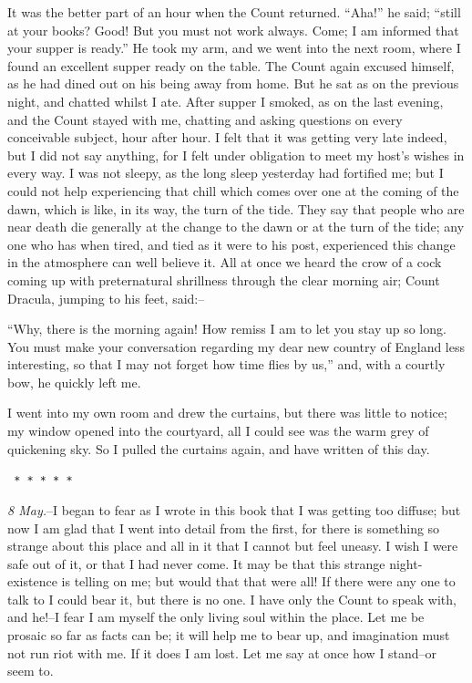 \documentclass[12pt,openright]{book}
\begin{document}
It was the better part of an hour when the Count returned. “Aha!” he said; “still at your books? Good! But you must not work always. Come; I am informed that your supper is ready.” He took my arm, and we went into the next room, where I found an excellent supper ready on the table. The Count again excused himself, as he had dined out on his being away from home. But he sat as on the previous night, and chatted whilst I ate. After supper I smoked, as on the last evening, and the Count stayed with me, chatting and asking questions on every conceivable subject, hour after hour. I felt that it was getting very late indeed, but I did not say anything, for I felt under obligation to meet my host’s wishes in every way. I was not sleepy, as the long sleep yesterday had fortified me; but I could not help experiencing that chill which comes over one at the coming of the dawn, which is like, in its way, the turn of the tide. They say that people who are near death die generally at the change to the dawn or at the turn of the tide; any one who has when tired, and tied as it were to his post, experienced this change in the atmosphere can well believe it. All at once we heard the crow of a cock coming up with preternatural shrillness through the clear morning air; Count Dracula, jumping to his feet, said:–

“Why, there is the morning again! How remiss I am to let you stay up so long. You must make your conversation regarding my dear new country of England less interesting, so that I may not forget how time flies by us,” and, with a courtly bow, he quickly left me.

I went into my own room and drew the curtains, but there was little to notice; my window opened into the courtyard, all I could see was the warm grey of quickening sky. So I pulled the curtains again, and have written of this day.

\texttt{   *       *       *       *       *}

\textit{8 May.}–I began to fear as I wrote in this book that I was getting too diffuse; but now I am glad that I went into detail from the first, for there is something so strange about this place and all in it that I cannot but feel uneasy. I wish I were safe out of it, or that I had never come. It may be that this strange night-existence is telling on me; but would that that were all! If there were any one to talk to I could bear it, but there is no one. I have only the Count to speak with, and he!–I fear I am myself the only living soul within the place. Let me be prosaic so far as facts can be; it will help me to bear up, and imagination must not run riot with me. If it does I am lost. Let me say at once how I stand–or seem to.
\end{document}
